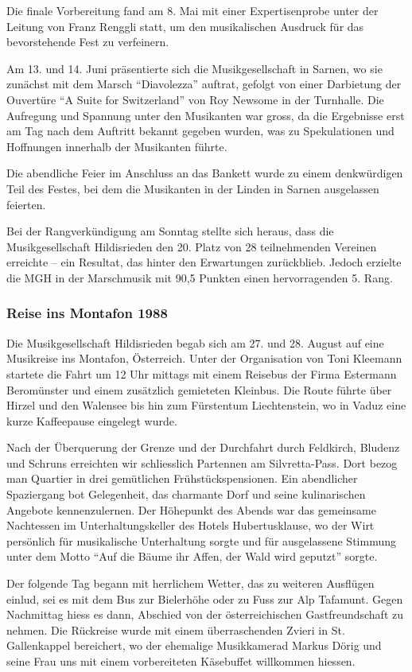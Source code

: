 \begin{history}
    Die finale Vorbereitung fand am 8. Mai mit einer Expertisenprobe unter der
    Leitung von Franz Renggli statt, um den musikalischen Ausdruck für das
    bevorstehende Fest zu verfeinern.

    Am 13. und 14. Juni präsentierte sich die Musikgesellschaft in Sarnen, wo
    sie zunächst mit dem Marsch \enquote{Diavolezza} auftrat, gefolgt von einer
    Darbietung der Ouvertüre \enquote{A Suite for Switzerland} von Roy Newsome
    in der Turnhalle. Die Aufregung und Spannung unter den Musikanten war gross,
    da die Ergebnisse erst am Tag nach dem Auftritt bekannt gegeben wurden, was
    zu Spekulationen und Hoffnungen innerhalb der Musikanten führte.

    Die abendliche Feier im Anschluss an das Bankett wurde zu einem denkwürdigen
    Teil des Festes, bei dem die Musikanten in der Linden in Sarnen ausgelassen
    feierten.

    Bei der Rangverkündigung am Sonntag stellte sich heraus, dass die
    Musikgesellschaft Hildisrieden den 20. Platz von 28 teilnehmenden Vereinen
    erreichte -- ein Resultat, das hinter den Erwartungen zurückblieb. Jedoch
    erzielte die MGH in der Marschmusik mit 90,5 Punkten einen hervorragenden 5.
    Rang.

    \subsubsection*{Reise ins Montafon 1988}

    Die Musikgesellschaft Hildisrieden begab sich am 27. und 28. August auf eine
    Musikreise ins Montafon, Österreich. Unter der Organisation von Toni
    Kleemann startete die Fahrt um 12 Uhr mittags mit einem Reisebus der Firma
    Estermann Beromünster und einem zusätzlich gemieteten Kleinbus. Die Route
    führte über Hirzel und den Walensee bis hin zum Fürstentum Liechtenstein, wo
    in Vaduz eine kurze Kaffeepause eingelegt wurde.

    Nach der Überquerung der Grenze und der Durchfahrt durch Feldkirch, Bludenz
    und Schruns erreichten wir schliesslich Partennen am Silvretta-Pass. Dort
    bezog man Quartier in drei gemütlichen Frühstückspensionen. Ein abendlicher
    Spaziergang bot Gelegenheit, das charmante Dorf und seine kulinarischen
    Angebote kennenzulernen. Der Höhepunkt des Abends war das gemeinsame
    Nachtessen im Unterhaltungskeller des Hotels Hubertusklause, wo der Wirt
    persönlich für musikalische Unterhaltung sorgte und für ausgelassene
    Stimmung unter dem Motto \enquote{Auf die Bäume ihr Affen, der Wald wird
        geputzt} sorgte.

    Der folgende Tag begann mit herrlichem Wetter, das zu weiteren Ausflügen
    einlud, sei es mit dem Bus zur Bielerhöhe oder zu Fuss zur Alp Tafamunt.
    Gegen Nachmittag hiess es dann, Abschied von der österreichischen
    Gastfreundschaft zu nehmen. Die Rückreise wurde mit einem überraschenden
    Zvieri in St. Gallenkappel bereichert, wo der ehemalige Musikkamerad Markus
    Dörig und seine Frau uns mit einem vorbereiteten Käsebuffet willkommen
    hiessen.

\end{history}

